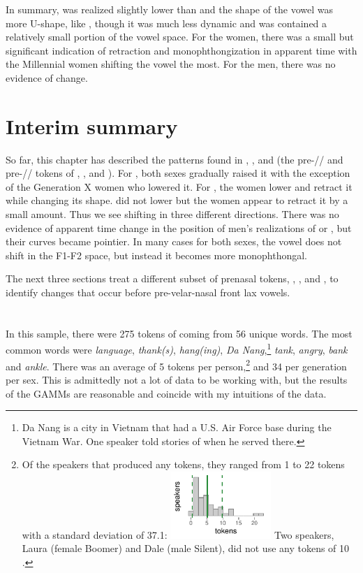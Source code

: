 In summary, \bin was realized slightly lower than \bit and the shape of the vowel was more U-shape, like \ban, though it was much less dynamic and was contained a relatively small portion of the vowel space. For the women, there was a small but significant indication of retraction and monophthongization in apparent time with the Millennial women shifting the vowel the most. For the men, there was no evidence of change.

\section{Interim summary}

So far, this chapter has described the patterns found in \ban, \ben, and \bin (the pre-// and pre-// tokens of \trap, \dress, and \kit). For \ban, both sexes gradually raised it with the exception of the Generation X women who lowered it. For \ben, the women lower and retract it while changing its shape. \bin did not lower but the women appear to retract it by a small amount. Thus we see shifting in three different directions. There was no evidence of apparent time change in the position of men's realizations of \ben or \bin, but their curves became pointier. In many cases for both sexes, the vowel does not shift in the F1-F2 space, but instead it becomes more monophthongal.

The next three sections treat a different subset of prenasal tokens, \bang, \beng, and \bing, to identify changes that occur before pre-velar-nasal front lax vowels.








\section{\bang}
\label{BANG}

In this sample, there were 275 tokens of \bang coming from 56 unique words. The most common words were \textit{language}, \textit{thank(s)}, \textit{hang(ing)}, \textit{Da Nang},\footnote{Da Nang is a city in Vietnam that had a U.S. Air Force base during the Vietnam War. One speaker told stories of when he served there.} \textit{tank}, \textit{angry}, \textit{bank} and \textit{ankle}. There was an average of 5 tokens per person,\footnote{Of the speakers that produced any \bang tokens, they ranged from 1 to 22 tokens with a standard deviation of 37.1: \includegraphics[width = 1.5in]{Figures/BANG/BANG_tiny.pdf} Two speakers, Laura (female Boomer) and Dale (male Silent), did not use any tokens of 10 \bang.} and 34 per generation per sex. This is admittedly not a lot of data to be working with, but the results of the GAMMs are reasonable and coincide with my intuitions of the data.

